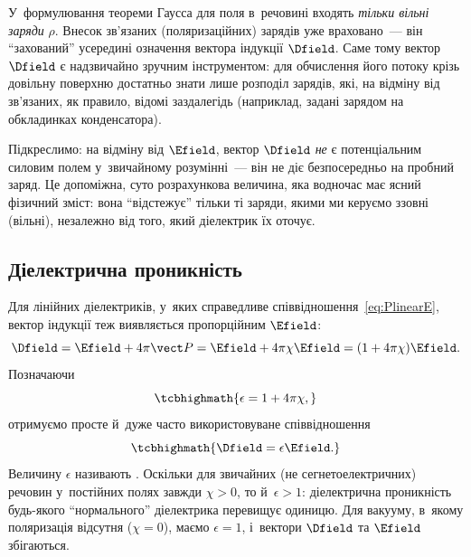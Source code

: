 \begin{Attention}
	У~формулювання теореми Гаусса для поля в~речовині входять \emph{тільки вільні заряди}
	$\rho$. Внесок зв'язаних (поляризаційних) зарядів уже враховано~--- він
	\enquote{захований} усередині означення вектора індукції $\Dfield$. Саме тому вектор
	$\Dfield$ є надзвичайно зручним інструментом: для обчислення його потоку крізь
	довільну поверхню достатньо знати лише розподіл  зарядів, які, на
	відміну від зв'язаних, як правило, відомі заздалегідь (наприклад, задані зарядом на
	обкладинках конденсатора).
\end{Attention}

Підкреслимо: на відміну від $\Efield$, вектор $\Dfield$ \emph{не} є потенціальним силовим
полем у~звичайному розумінні~--- він не діє безпосередньо на пробний заряд. Це допоміжна,
суто розрахункова величина, яка водночас має ясний фізичний зміст: вона
\enquote{відстежує} тільки ті заряди, якими ми керуємо ззовні (вільні), незалежно від
того, який діелектрик їх оточує.


\subsection*{Діелектрична проникність}


Для лінійних діелектриків, у~яких справедливе співвідношення~\eqref{eq:PlinearE}, вектор
індукції теж виявляється пропорційним $\Efield$:
\begin{equation*}
	\Dfield = \Efield + 4\pi\vect P = \Efield + 4\pi\chi\Efield = (1+4\pi\chi)\Efield.
\end{equation*}
Позначаючи
\begin{equation}\label{eq:eps}
	\tcbhighmath{
		\epsilon = 1 + 4\pi\chi,
	}
\end{equation}
отримуємо просте й~дуже часто використовуване співвідношення
\begin{equation}\label{eq:DepsE}
	\tcbhighmath{
		\Dfield = \epsilon\Efield.
	}
\end{equation}
Величину $\epsilon$ називають . Оскільки для
звичайних (не сегнетоелектричних) речовин у~постійних полях завжди $\chi > 0$, то
й~$\epsilon > 1$: діелектрична проникність будь-якого \enquote{нормального} діелектрика
перевищує одиницю. Для вакууму, в~якому поляризація відсутня ($\chi = 0$), маємо $\epsilon
	= 1$, і~вектори $\Dfield$ та $\Efield$ збігаються.

